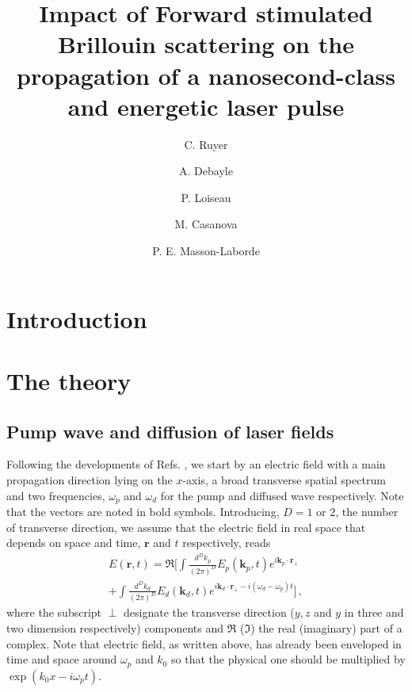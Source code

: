 \documentclass[
 reprint,
 amsmath,amssymb,
 aps,
]{revtex4-1}
\begin{document}
\title{Impact of Forward stimulated Brillouin scattering on the propagation of a nanosecond-class and energetic laser pulse}
\author{C. Ruyer}
\author{A. Debayle}
\author{P. Loiseau}
\author{M. Casanova}
\author{P. E. Masson-Laborde}

\begin{abstract}
\end{abstract}

\maketitle

\section{Introduction}

\section{The theory}
\subsection{Pump wave and diffusion of  laser fields}
Following the developments of Refs. \cite[]{phd-Grech,PRL_Grech_2009}, we start by an electric field with a main propagation direction lying on the $x$-axis, a broad transverse spatial spectrum and two frequencies, $\omega_p$ and $\omega_d$ for the pump and diffused wave  respectively.  Note that the vectors are noted in bold symbols. Introducing, $D=1$ or $2$, the number of transverse direction, we assume that the electric field in real space that depends on space and time, $\mathbf{r}$  and $t$ respectively, reads
\begin{align}
E(\mathbf{r},t)= \Re \Big[ \int \frac{d^Dk_p}{(2\pi)^D} E_p (\mathbf{k}_p,t) e^{i \mathbf{k}_p \cdot \mathbf{r}_\perp} \nonumber \\
+\int \frac{d^Dk_d}{(2\pi)^D} E_d (\mathbf{k}_d,t) e^{i \mathbf{k}_d \cdot \mathbf{r}_\perp -i (\omega_d - \omega_p)t}   \Big] \, ,
\end{align}
where the subscript $\perp$ designate the transverse direction ($y,z$ and $y$ in three and two dimension respectively)  components and $\Re$  ($\Im$) the real (imaginary) part of a complex. Note that electric field, as written above,  has already been enveloped in time and space around $\omega_p$ and $k_0$ so that the physical one should be multiplied  by $\exp(k_0 x-i\omega_p t)$.
\end{document}
